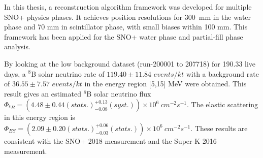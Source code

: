 In this thesis, a reconstruction algorithm framework was developed for multiple SNO+ physics phases. It achieves position resolutions for 300~mm in the water phase and 70 mm in scintillator phase, with small biases within 100 mm. This framework has been applied for the SNO+ water phase and partial-fill phase analysis. 

By looking at the low background dataset (run-200001 to 207718) for 190.33 live days, a $^8$B solar neutrino rate of $119.40\pm11.84$ $events/kt$ with a background rate of $36.55\pm7.57$ $events/kt$ in the energy region [5,15] MeV were obtained. This result gives an estimated $^8$B solar neutrino flux $\Phi_{^8B}=(4.48 \pm 0.44(stats.)^{+0.13}_{-0.08}(syst.))\times10^6~cm^{-2}s^{-1}$. The elastic scattering in this energy region is $\Phi_{ES}=(2.09 \pm 0.20(stats.)^{+0.06}_{-0.03}(stats.))\times10^6~cm^{-2}s^{-1}$. These results are consistent with the SNO+ 2018 measurement\cite{anderson2019measurement} and the Super-K 2016 measurement\cite{abe2016solar}.


